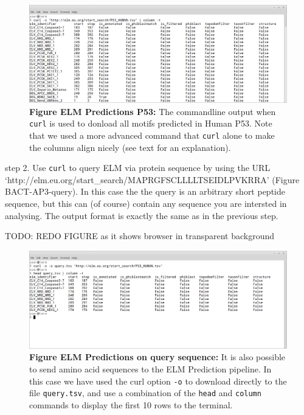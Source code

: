 \begin{figure}[h!]
\centering
\includegraphics[width=\textwidth]{Figures/BACT_3/curl_P53.png}
\caption{
\textbf{Figure ELM Predictions P53:}
The commandline output when \texttt{curl} is used to
donload all motifs predicted in Human P53. Note that we used a more
advanced command that \texttt{curl} alone to make the columns align
nicely (see text for an explanation).
}
\end{figure}

step 2. Use \texttt{curl} to query ELM via protein sequence by using the
URL `http://elm.eu.org/start\_search/MAPRGFSCLLLLTSEIDLPVKRRA' (Figure
BACT-AP3-query). In this case the the query is an arbitrary short
peptide sequence, but this can (of course) contain any sequence you are
intersted in analysing. The output format is exactly the same as in the
previous step.


TODO: REDO FIGURE as it shows browser in transparent background

\begin{figure}[h!]
\centering
\includegraphics[width=\textwidth]{Figures/BACT_3/predictions_query.png} 
\caption{
\textbf{Figure ELM Predictions on query sequence:}
It is also possible to send amino
acid sequences to the ELM Prediction pipeline. In this case we have used
the curl option \texttt{-o} to download directly to the file
\texttt{query.tsv}, and use a combination of the \texttt{head} and
\texttt{column} commands to display the first 10 rows to the terminal.
}
\end{figure}

